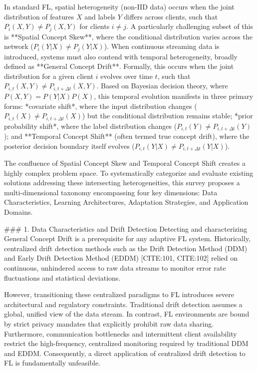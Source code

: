 \documentclass[journal]{IEEEtran}
\begin{document}
In standard FL, spatial heterogeneity (non-IID data) occurs when the joint distribution of features $X$ and labels $Y$ differs across clients, such that $P_i(X, Y) \neq P_j(X, Y)$ for clients $i \neq j$. A particularly challenging subset of this is **Spatial Concept Skew**, where the conditional distribution varies across the network ($P_i(Y|X) \neq P_j(Y|X)$). When continuous streaming data is introduced, systems must also contend with temporal heterogeneity, broadly defined as **General Concept Drift**. Formally, this occurs when the joint distribution for a given client $i$ evolves over time $t$, such that $P_{i, t}(X, Y) \neq P_{i, t+\Delta t}(X, Y)$. Based on Bayesian decision theory, where $P(X, Y) = P(Y|X)P(X)$, this temporal evolution manifests in three primary forms: *covariate shift*, where the input distribution changes ($P_{i,t}(X) \neq P_{i,t+\Delta t}(X)$) but the conditional distribution remains stable; *prior probability shift*, where the label distribution changes ($P_{i,t}(Y) \neq P_{i,t+\Delta t}(Y)$); and **Temporal Concept Shift** (often termed true concept drift), where the posterior decision boundary itself evolves ($P_{i,t}(Y|X) \neq P_{i,t+\Delta t}(Y|X)$). 

The confluence of Spatial Concept Skew and Temporal Concept Shift creates a highly complex problem space. To systematically categorize and evaluate existing solutions addressing these intersecting heterogeneities, this survey proposes a multi-dimensional taxonomy encompassing four key dimensions: Data Characteristics, Learning Architectures, Adaptation Strategies, and Application Domains.

\#\#\# 1. Data Characteristics and Drift Detection
Detecting and characterizing General Concept Drift is a prerequisite for any adaptive FL system. Historically, centralized drift detection methods such as the Drift Detection Method (DDM) and Early Drift Detection Method (EDDM) [CITE:101, CITE:102] relied on continuous, unhindered access to raw data streams to monitor error rate fluctuations and statistical deviations. 

However, transitioning these centralized paradigms to FL introduces severe architectural and regulatory constraints. Traditional drift detection assumes a global, unified view of the data stream. In contrast, FL environments are bound by strict privacy mandates that explicitly prohibit raw data sharing. Furthermore, communication bottlenecks and intermittent client availability restrict the high-frequency, centralized monitoring required by traditional DDM and EDDM. Consequently, a direct application of centralized drift detection to FL is fundamentally unfeasible.
\end{document}

